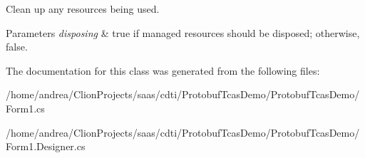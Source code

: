 Clean up any resources being used. 


\begin{DoxyParams}{Parameters}
{\em disposing} & true if managed resources should be disposed; otherwise, false.\\
\hline
\end{DoxyParams}


The documentation for this class was generated from the following files\+:\begin{DoxyCompactItemize}
\item 
/home/andrea/\+Clion\+Projects/saas/cdti/\+Protobuf\+Tcas\+Demo/\+Protobuf\+Tcas\+Demo/Form1.\+cs\item 
/home/andrea/\+Clion\+Projects/saas/cdti/\+Protobuf\+Tcas\+Demo/\+Protobuf\+Tcas\+Demo/Form1.\+Designer.\+cs\end{DoxyCompactItemize}

